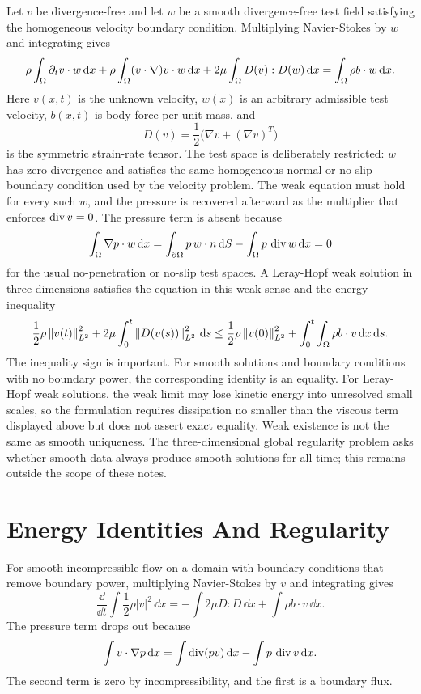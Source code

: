 Let \(v\) be divergence-free and let \(w\) be a smooth divergence-free test
field satisfying the homogeneous velocity boundary condition.  Multiplying
Navier-Stokes by \(w\) and integrating gives
\[
        \rho\int_\Omega \partial_t v\cdot w\,\mathrm{d} x
        +
        \rho\int_\Omega (v\cdot\nabla)v\cdot w\,\mathrm{d} x
        +
        2\mu\int_\Omega D(v):D(w)\,\mathrm{d} x
        =
        \int_\Omega \rho b\cdot w\,\mathrm{d} x .
\]
Here \(v(x,t)\) is the unknown velocity, \(w(x)\) is an arbitrary admissible
test velocity, \(b(x,t)\) is body force per unit mass, and
\[
        D(v)=\frac12\bigl(\nabla v+(\nabla v)^T\bigr)
\]
is the symmetric strain-rate tensor.  The test space is deliberately
restricted: \(w\) has zero divergence and satisfies the same homogeneous
normal or no-slip boundary condition used by the velocity problem.  The weak
equation must hold for every such \(w\), and the pressure is recovered
afterward as the multiplier that enforces \(\operatorname{div} v=0\).
The pressure term is absent because
\[
        \int_\Omega \nabla p\cdot w\,\mathrm{d} x
        =
        \int_{\partial\Omega}p\,w\cdot n\,\mathrm{d} S
        -
        \int_\Omega p\,\operatorname{div} w\,\mathrm{d} x
        =
        0
\]
for the usual no-penetration or no-slip test spaces.  A Leray-Hopf weak
solution in three dimensions satisfies the equation in this weak sense and the
energy inequality
\[
        \frac{1}{2}\rho\left\lVert v(t)\right\rVert_{L^2}^2
        +
        2\mu\int_0^t\left\lVert D(v(s))\right\rVert_{L^2}^2\,\mathrm{d} s
        \le
        \frac{1}{2}\rho\left\lVert v(0)\right\rVert_{L^2}^2
        +
        \int_0^t\int_\Omega \rho b\cdot v\,\mathrm{d} x\,\mathrm{d} s .
\]
The inequality sign is important.  For smooth solutions and boundary
conditions with no boundary power, the corresponding identity is an equality.
For Leray-Hopf weak solutions, the weak limit may lose kinetic energy into
unresolved small scales, so the formulation requires dissipation no smaller
than the viscous term displayed above but does not assert exact equality.
Weak existence is not the same as smooth uniqueness.  The three-dimensional
global regularity problem asks whether smooth data always produce smooth
solutions for all time; this remains outside the scope of these notes.

\section{Energy Identities And Regularity}
\label{sec:continuum-energy-regularity}

For smooth incompressible flow on a domain with boundary conditions that remove
boundary power, multiplying Navier-Stokes by \(v\) and integrating gives
\[
        \frac{\dd}{\dd t}\int \frac{1}{2}\rho |v|^2\,\dd x
        =
        -\int 2\mu D:D\,\dd x
        +
        \int \rho b\cdot v\,\dd x .
\]
The pressure term drops out because
\[
        \int v\cdot\nabla p\,\mathrm{d} x
        =
        \int \operatorname{div}(pv)\,\mathrm{d} x-\int p\,\operatorname{div} v\,\mathrm{d} x.
\]
The second term is zero by incompressibility, and the first is a boundary flux.

